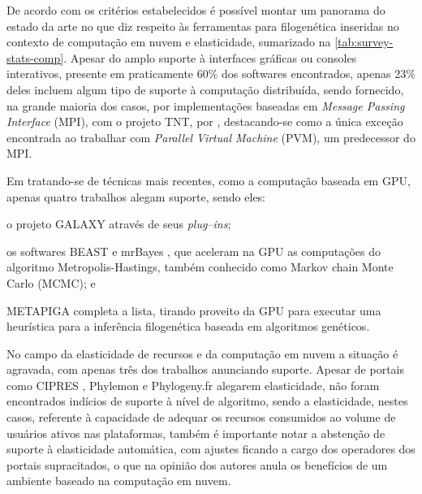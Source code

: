 \documentclass[english,brazilian]{UNISINOSmonografia} %
\begin{document}
De acordo com os critérios estabelecidos é possível montar um panorama do estado da arte no que diz respeito às ferramentas para filogenética inseridas no contexto de computação em nuvem e elasticidade, sumarizado na \autoref{tab:survey-stats-comp}.
Apesar do amplo suporte à interfaces gráficas ou consoles interativos, presente em praticamente 60\% dos softwares encontrados, apenas 23\% deles incluem algum tipo de suporte à computação distribuída, sendo fornecido, na grande maioria dos casos, por implementações baseadas em \textit{Message Passing Interface} (MPI), com o projeto TNT, por , destacando-se como a única exceção encontrada ao trabalhar com \textit{Parallel Virtual Machine} (PVM), um predecessor do MPI.


Em tratando-se de técnicas mais recentes, como a computação baseada em GPU, apenas quatro trabalhos alegam suporte, sendo eles:
\begin{inparaenum}
	\item o projeto GALAXY \cite{Afgan2016} através de seus \textit{plug--ins};
	\item os softwares BEAST \cite{Drummond2002} e mrBayes \cite{Huelsenbeck2001}, que aceleram na GPU as computações do algoritmo Metropolis-Hastings, também conhecido como Markov chain Monte Carlo (MCMC); e
	\item METAPIGA \cite{Helaers2010} completa a lista, tirando proveito da GPU para executar uma heurística para a inferência filogenética baseada em algoritmos genéticos.
\end{inparaenum}


No campo da elasticidade de recursos e da computação em nuvem a situação é agravada, com apenas três dos trabalhos anunciando suporte.
Apesar de portais como CIPRES \cite{Miller2010}, Phylemon \cite{Tarraga2007,Sanchez2011} e Phylogeny.fr \cite{Dereeper2008} alegarem elasticidade, não foram encontrados indícios de suporte à nível de algoritmo, sendo a elasticidade, nestes casos, referente à capacidade de adequar os recursos consumidos ao volume de usuários ativos nas plataformas, também é importante notar a abstenção de suporte à elasticidade automática, com ajustes ficando a cargo dos operadores dos portais supracitados, o que na opinião dos autores anula os benefícios de um ambiente baseado na computação em nuvem.
\end{document}
